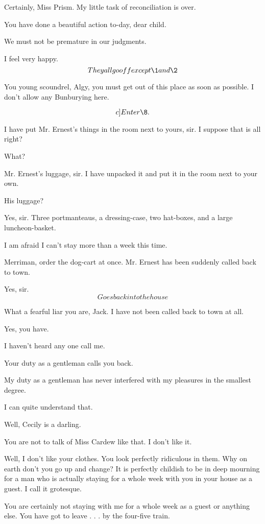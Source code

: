 \documentclass{book}
\begin{document}
\5  Certainly, Miss Prism.  My little task of reconciliation
is over.

\7  You have done a beautiful action to-day, dear child.

\6  We must not be premature in our judgments.

\5  I feel very happy.  \[They all go off except \1 and \2\]

\1  You young scoundrel, Algy, you must get out of this place as
soon as possible.  I don't allow any Bunburying here.

\[c]Enter \8.\]

\8  I have put Mr. Ernest's things in the room next to
yours, sir.  I suppose that is all right?

\1  What?

\8  Mr. Ernest's luggage, sir.  I have unpacked it and put
it in the room next to your own.

\1  His luggage?

\8  Yes, sir.  Three portmanteaus, a dressing-case, two hat-boxes,
and a large luncheon-basket.

\2  I am afraid I can't stay more than a week this time.

\1  Merriman, order the dog-cart at once.  Mr. Ernest has been
suddenly called back to town.

\8  Yes, sir.  \[Goes back into the house\]

\2  What a fearful liar you are, Jack.  I have not been
called back to town at all.

\1  Yes, you have.

\2  I haven't heard any one call me.

\1  Your duty as a gentleman calls you back.

\2  My duty as a gentleman has never interfered with my
pleasures in the smallest degree.

\1  I can quite understand that.

\2  Well, Cecily is a darling.

\1  You are not to talk of Miss Cardew like that.  I don't like
it.

\2  Well, I don't like your clothes.  You look perfectly
ridiculous in them.  Why on earth don't you go up and change?  It
is perfectly childish to be in deep mourning for a man who is
actually staying for a whole week with you in your house as a
guest.  I call it grotesque.

\1  You are certainly not staying with me for a whole week as a
guest or anything else.  You have got to leave . . . by the four-five
train.
\end{document}
